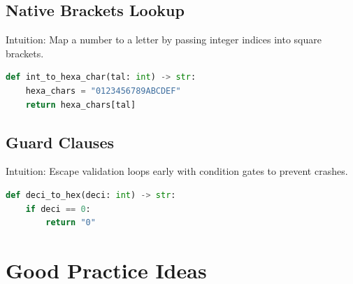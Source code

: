 \documentclass{article}
\begin{document}
\subsection{Native Brackets Lookup}
Intuition: Map a number to a letter by passing integer indices into square brackets.
\begin{lstlisting}[language=Python]
def int_to_hexa_char(tal: int) -> str:
    hexa_chars = "0123456789ABCDEF"
    return hexa_chars[tal]
\end{lstlisting}

\subsection{Guard Clauses}
Intuition: Escape validation loops early with condition gates to prevent crashes.
\begin{lstlisting}[language=Python]
def deci_to_hex(deci: int) -> str:
    if deci == 0:
        return "0"
\end{lstlisting}

\section{Good Practice Ideas}
\end{document}
